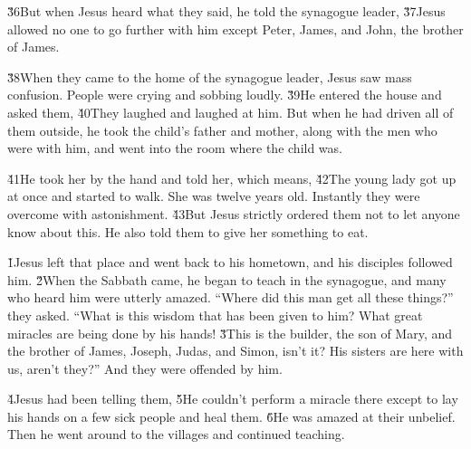 \v{36}But when Jesus heard what they said, he told the synagogue leader,  \v{37}Jesus allowed no one to go further with him except Peter, James, and John, the brother of James.

\v{38}When they came to the home of the synagogue leader, Jesus saw mass confusion. People were crying and sobbing loudly. \v{39}He entered the house and asked them,  \v{40}They laughed and laughed at him. But when he had driven all of them outside, he took the child's father and mother, along with the men who were with him, and went into the room where the child was.

\v{41}He took her by the hand and told her,  which means,  \v{42}The young lady got up at once and started to walk. She was twelve years old. Instantly they were overcome with astonishment. \v{43}But Jesus strictly ordered them not to let anyone know about this. He also told them to give her something to eat.

\v{1}Jesus left that place and went back to his hometown, and his disciples followed him. \v{2}When the Sabbath came, he began to teach in the synagogue, and many who heard him were utterly amazed. ``Where did this man get all these things?'' they asked. ``What is this wisdom that has been given to him? What great miracles are being done by his hands! \v{3}This is the builder, the son of Mary, and the brother of James, Joseph, Judas, and Simon, isn't it? His sisters are here with us, aren't they?'' And they were offended by him.

\v{4}Jesus had been telling them,  \v{5}He couldn't perform a miracle there except to lay his hands on a few sick people and heal them. \v{6}He was amazed at their unbelief. Then he went around to the villages and continued teaching.

